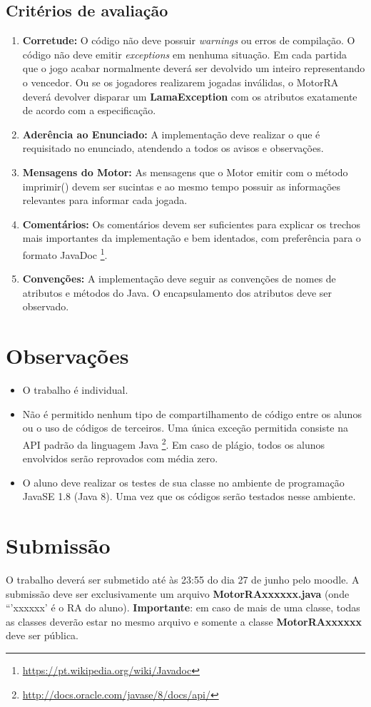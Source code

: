 \documentclass[10pt]{article}
\begin{document}
\subsection{Critérios de avaliação} \label{ssec:criterio}

\begin{enumerate}
    \item \textbf{Corretude:} O código não deve possuir \textit{warnings} ou erros de compilação. O código não deve emitir \textit{exceptions} em nenhuma situação. Em cada partida que o jogo acabar normalmente deverá ser devolvido um inteiro representando o vencedor. Ou se os jogadores realizarem jogadas inválidas, o MotorRA deverá devolver disparar um \textbf{LamaException} com os atributos exatamente de acordo com a especificação.
    \item \textbf{Aderência ao Enunciado:} A implementação deve realizar o que é requisitado no enunciado, atendendo a todos os avisos e observações.
    \item \textbf{Mensagens do Motor:} As mensagens que o Motor emitir com o método imprimir() devem ser sucintas e ao mesmo tempo possuir as informações relevantes para informar cada jogada.
    \item \textbf{Comentários:} Os comentários devem ser suficientes para explicar os trechos mais importantes da implementação e bem identados, com preferência para o formato JavaDoc \footnote{\url{https://pt.wikipedia.org/wiki/Javadoc}}.
    \item \textbf{Convenções:} A implementação deve seguir as convenções de nomes de atributos e métodos do Java. O encapsulamento dos atributos deve ser observado.
\end{enumerate}

\section{Observações}

\begin{itemize}
    \item O trabalho é individual.
    \item Não é permitido nenhum tipo de compartilhamento de código entre os alunos ou o uso de códigos de terceiros. Uma única exceção permitida consiste na API padrão da linguagem Java \footnote{\url{http://docs.oracle.com/javase/8/docs/api/}}. Em caso de plágio, todos os alunos envolvidos serão reprovados com média zero.
    \item O aluno deve realizar os testes de sua classe no ambiente de programação JavaSE 1.8 (Java 8). Uma vez que os códigos serão testados nesse ambiente.
\end{itemize}
 
\section{Submissão}

O trabalho deverá ser submetido até às 23:55 do dia 27 de junho pelo moodle. A submissão deve ser exclusivamente um arquivo \textbf{MotorRAxxxxxx.java} (onde ``'xxxxxx' é o RA do aluno). \textbf{Importante}: em caso de mais de uma classe, todas as classes deverão estar no mesmo arquivo e somente a classe \textbf{MotorRAxxxxxx} deve ser pública.
\end{document}
